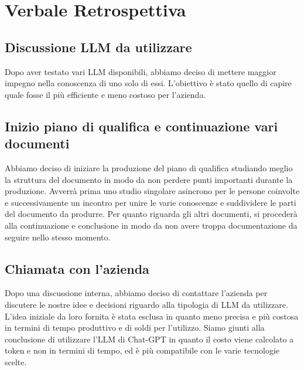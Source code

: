 \documentclass{article}
\begin{document}
\newpage
\section{Verbale Retrospettiva}

    \subsection{Discussione LLM da utilizzare}
    Dopo aver testato vari LLM disponibili, abbiamo deciso di mettere maggior impegno nella conoscenza di uno solo di essi. L'obiettivo è stato quello di capire quale fosse il più efficiente e meno costoso per l'azienda.

    \subsection{Inizio piano di qualifica e continuazione vari documenti}
    Abbiamo deciso di iniziare la produzione del piano di qualifica studiando meglio la struttura del documento in modo da non perdere punti importanti durante la produzione. Avverrà prima uno studio singolare asincrono per le persone coinvolte e successivamente un incontro per unire le varie conoscenze e suddividere le parti del documento da produrre. Per quanto riguarda gli altri documenti, si procederà alla continuazione e conclusione in modo da non avere troppa documentazione da seguire nello stesso momento.

    \subsection{Chiamata con l'azienda}
    Dopo una discussione interna, abbiamo deciso di contattare l'azienda per discutere le nostre idee e decisioni riguardo alla tipologia di LLM da utilizzare. L'idea iniziale da loro fornita è stata esclusa in quanto meno precisa e più costosa in termini di tempo produttivo e di soldi per l'utilizzo. Siamo giunti alla conclusione di utilizzare l'LLM di Chat-GPT in quanto il costo viene calcolato a token e non in termini di tempo, ed è più compatibile con le varie tecnologie scelte.
    
\end{document}
